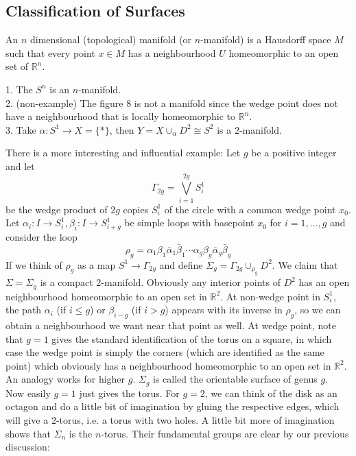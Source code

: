 \subsection{Classification of Surfaces}
\begin{definition}
    An $n$ dimensional (topological) manifold (or $n$-manifold) is a Hausdorff space $M$ such that every point $x\in M$ has a neighbourhood $U$ homeomorphic to an open set of $\mathbb R^n$.
\end{definition}
\begin{example}
    1. The $S^n$ is an $n$-manifold.\\
    2. (non-example) The figure 8 is not a manifold since the wedge point does not have a neighbourhood that is locally homeomorphic to $\mathbb R^n$.\\
    3. Take $\alpha:S^1\to X=\{\ast\}$, then $Y=X\cup_\alpha D^2\cong S^2$ is a $2$-manifold.
\end{example}
There is a more interesting and influential example:
Let $g$ be a positive integer and let
$$\Gamma_{2g}=\bigvee_{i=1}^{2g}S^1_i$$
be the wedge product of $2g$ copies $S_i^1$ of the circle with a common wedge point $x_0$.
Let $\alpha_i:I\to S_i^1,\beta_i:I\to S_{i+g}^1$ be simple loops with basepoint $x_0$ for $i=1,\ldots,g$ and consider the loop
$$\rho_g=\alpha_1\beta_1\bar\alpha_1\bar\beta_1\cdots\alpha_g\beta_g\bar\alpha_g\bar\beta_g$$
If we think of $\rho_g$ as a map $S^1\to \Gamma_{2g}$ and define $\Sigma_g=\Gamma_{2g}\cup_{\rho_g}D^2$.
We claim that $\Sigma=\Sigma_g$ is a compact $2$-manifold.
Obviously any interior points of $D^2$ has an open neighbourhood homeomorphic to an open set in $\mathbb R^2$.
At non-wedge point in $S_i^1$, the path $\alpha_i$ (if $i\le g$) or $\beta_{i-g}$ (if $i>g$) appears with its inverse in $\rho_g$, so we can obtain a neighbourhood we want near that point as well.
At wedge point, note that $g=1$ gives the standard identification of the torus on a square, in which case the wedge point is simply the corners (which are identified as the same point) which obviously has a neighbourhood homeomorphic to an open set in $\mathbb R^2$.
An analogy works for higher $g$.
$\Sigma_g$ is called the orientable surface of genus $g$.\\
Now easily $g=1$ just gives the torus.
For $g=2$, we can think of the disk as an octagon and do a little bit of imagination by gluing the respective edges, which will give a $2$-torus, i.e. a torus with two holes.
A little bit more of imagination shows that $\Sigma_n$ is the $n$-torus.
Their fundamental groups are clear by our previous discussion:
